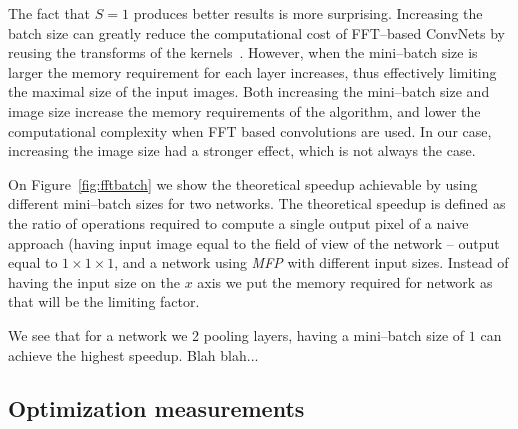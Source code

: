 \documentclass[conference]{IEEEtran}
\begin{document}
  The fact that $S=1$ produces better results is more surprising.
  Increasing the batch size can greatly reduce the computational cost
  of FFT--based ConvNets by reusing the transforms of the
  kernels~\cite{mathieu-iclr-14,vasilache2014fast}.  However, when the
  mini--batch size is larger the memory requirement for each layer
  increases, thus effectively limiting the maximal size of the input
  images.  Both increasing the mini--batch size and image size
  increase the memory requirements of the algorithm, and lower the
  computational complexity when FFT based convolutions are used.  In
  our case, increasing the image size had a stronger effect, which is
  not always the case.

  On Figure~\ref{fig:fftbatch} we show the theoretical speedup
  achievable by using different mini--batch sizes for two networks.
  The theoretical speedup is defined as the ratio of operations
  required to compute a single output pixel of a naive approach
  (having input image equal to the field of view of the network --
  output equal to $1 \times 1 \times 1$, and a network using
  \emph{MFP} with different input sizes.  Instead of having the input
  size on the $x$ axis we put the memory required for network as that
  will be the limiting factor.

  We see that for a network we 2 pooling layers, having a mini--batch
  size of $1$ can achieve the highest speedup.  Blah blah...


\subsection{Optimization measurements}


\end{document}
